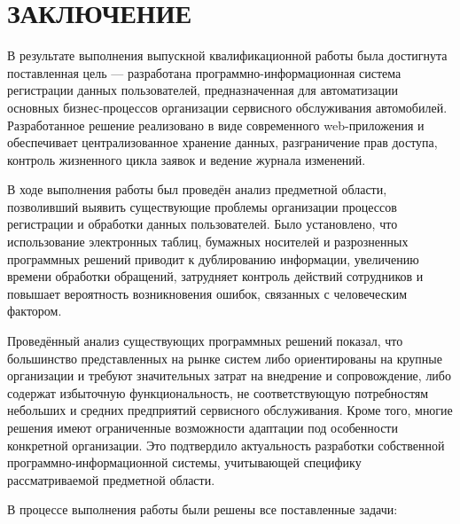 \section*{ЗАКЛЮЧЕНИЕ}

В результате выполнения выпускной квалификационной работы была достигнута поставленная цель --- разработана программно-информационная система регистрации данных пользователей, предназначенная для автоматизации основных бизнес-процессов организации сервисного обслуживания автомобилей. Разработанное решение реализовано в виде современного web-приложения и обеспечивает централизованное хранение данных, разграничение прав доступа, контроль жизненного цикла заявок и ведение журнала изменений.

В ходе выполнения работы был проведён анализ предметной области, позволивший выявить существующие проблемы организации процессов регистрации и обработки данных пользователей. Было установлено, что использование электронных таблиц, бумажных носителей и разрозненных программных решений приводит к дублированию информации, увеличению времени обработки обращений, затрудняет контроль действий сотрудников и повышает вероятность возникновения ошибок, связанных с человеческим фактором.

Проведённый анализ существующих программных решений показал, что большинство представленных на рынке систем либо ориентированы на крупные организации и требуют значительных затрат на внедрение и сопровождение, либо содержат избыточную функциональность, не соответствующую потребностям небольших и средних предприятий сервисного обслуживания. Кроме того, многие решения имеют ограниченные возможности адаптации под особенности конкретной организации. Это подтвердило актуальность разработки собственной программно-информационной системы, учитывающей специфику рассматриваемой предметной области.

В процессе выполнения работы были решены все поставленные задачи:

